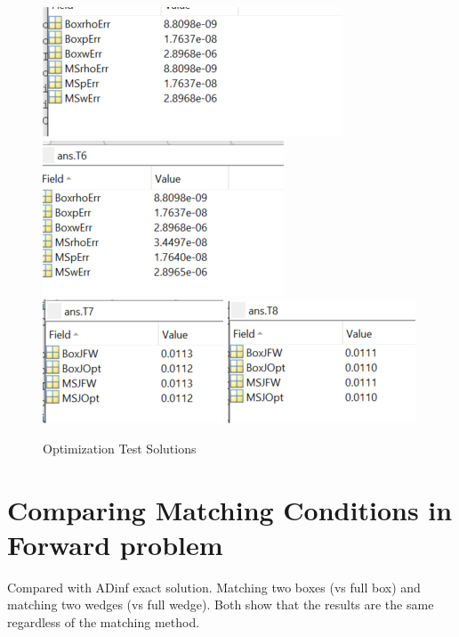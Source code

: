 \documentclass[11pt, a4paper]{article}
\theoremstyle{definition}
\begin{document}
	\begin{figure}[h]
		\centering
		\includegraphics[scale=1]{T5.png}
		\includegraphics[scale=1]{T6.png}\\
		\includegraphics[scale=1]{T7.png}
		\includegraphics[scale=1]{T8.png}
		\caption{Optimization Test Solutions} 
		\label{F0b}
	\end{figure}
	
	\section{Comparing Matching Conditions in Forward problem}
	Compared with ADinf exact solution. Matching two boxes (vs full box)  and matching two wedges (vs full wedge). Both show that the results are the same regardless of the matching method.
	
\end{document}
